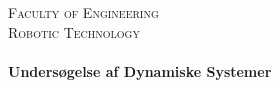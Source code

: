 \begin{titlepage}
\begin{center}




\textsc{\huge \color{sdu_grey} Faculty of Engineering}\\[0.5cm]

\textsc{\LARGE \color{sdu_grey} Robotic Technology}\\[0.5cm]

\HRule \\[1ex]
{ \Huge \bfseries Undersøgelse af Dynamiske Systemer \\[1ex] }

\HRule \\[1.5cm]


\end{center}
\end{titlepage}
